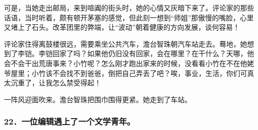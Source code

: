 \par 可是，当她走出邮局，来到喧阗的街头时，她的心情又灰暗下来了。评论家的那些话语，当时听着，颇有顿开茅塞的感觉，但此刻一想到“师姐”那傲慢的嘴脸，心里又堵上了石头。改革团里的弊端，让“波动”朝着健康的方向发展，谈何容易！
\par 评论家住得离鼓楼很远，需要乘坐公共汽车，澹台智珠朝汽车站走去。蓦地，她想到了李铠。李铠回家了吗？如果他仍旧没有回家，会在哪里？在干什么？天哪，他会不会干出荒唐事来？小竹呢？怎么刚才跑出家来的时候，没看看小竹在不在他姥爷屋里；小竹该不会找不到爸爸，倒把自己弄丢了吧？唉，事业，生活，你们可真太沉重了，让我怎么禁受得起！
\par 一阵风迎面吹来。澹台智珠把围巾围得更紧。她走到了车站。



\subsubsection*{22．一位编辑遇上了一个文学青年。}


